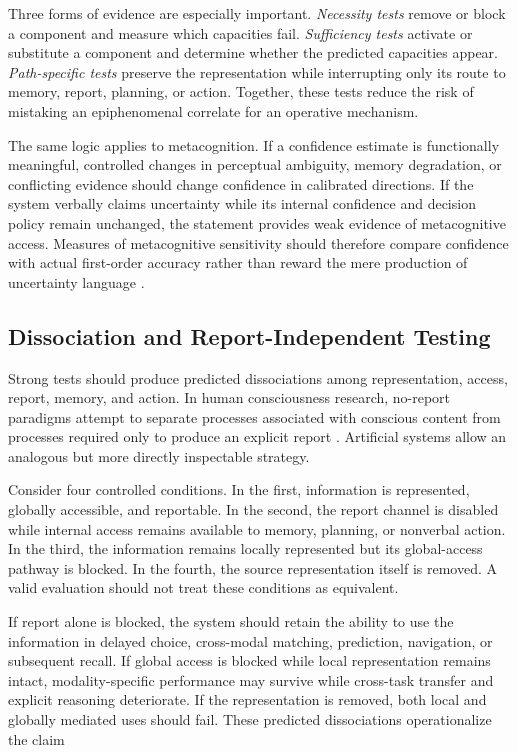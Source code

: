 Three forms of evidence are especially important. \emph{Necessity tests} remove or block a component and measure which capacities fail. \emph{Sufficiency tests} activate or substitute a component and determine whether the predicted capacities appear. \emph{Path-specific tests} preserve the representation while interrupting only its route to memory, report, planning, or action. Together, these tests reduce the risk of mistaking an epiphenomenal correlate for an operative mechanism.

The same logic applies to metacognition. If a confidence estimate is functionally meaningful, controlled changes in perceptual ambiguity, memory degradation, or conflicting evidence should change confidence in calibrated directions. If the system verbally claims uncertainty while its internal confidence and decision policy remain unchanged, the statement provides weak evidence of metacognitive access. Measures of metacognitive sensitivity should therefore compare confidence with actual first-order accuracy rather than reward the mere production of uncertainty language \cite{fleming2012neural,fleming2014measure}.

\subsection{Dissociation and Report-Independent Testing}

Strong tests should produce predicted dissociations among representation, access, report, memory, and action. In human consciousness research, no-report paradigms attempt to separate processes associated with conscious content from processes required only to produce an explicit report \cite{tsuchiya2015noreport}. Artificial systems allow an analogous but more directly inspectable strategy.

Consider four controlled conditions. In the first, information is represented, globally accessible, and reportable. In the second, the report channel is disabled while internal access remains available to memory, planning, or nonverbal action. In the third, the information remains locally represented but its global-access pathway is blocked. In the fourth, the source representation itself is removed. A valid evaluation should not treat these conditions as equivalent.

If report alone is blocked, the system should retain the ability to use the information in delayed choice, cross-modal matching, prediction, navigation, or subsequent recall. If global access is blocked while local representation remains intact, modality-specific performance may survive while cross-task transfer and explicit reasoning deteriorate. If the representation is removed, both local and globally mediated uses should fail. These predicted dissociations operationalize the claim

